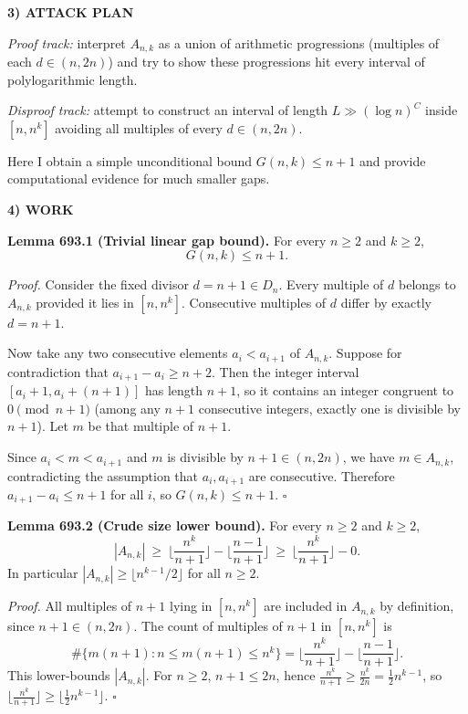 \bigskip
\noindent\textbf{3) ATTACK PLAN}

\emph{Proof track:} interpret $A_{n,k}$ as a union of arithmetic progressions (multiples of each $d\in(n,2n)$) and try to show these progressions hit every interval of polylogarithmic length.

\emph{Disproof track:} attempt to construct an interval of length $L\gg (\log n)^C$ inside $[n,n^k]$ avoiding all multiples of every $d\in(n,2n)$.

Here I obtain a simple unconditional bound $G(n,k)\le n+1$ and provide computational evidence for much smaller gaps.

\bigskip
\noindent\textbf{4) WORK}

\noindent\textbf{Lemma 693.1 (Trivial linear gap bound).}
For every $n\ge 2$ and $k\ge 2$,
\[
G(n,k)\le n+1.
\]

\smallskip
\noindent\emph{Proof.}
Consider the fixed divisor $d=n+1\in D_n$. Every multiple of $d$ belongs to $A_{n,k}$ provided it lies in $[n,n^k]$. Consecutive multiples of $d$ differ by exactly $d=n+1$.

Now take any two consecutive elements $a_i<a_{i+1}$ of $A_{n,k}$. Suppose for contradiction that $a_{i+1}-a_i\ge n+2$. Then the integer interval $[a_i+1,a_i+(n+1)]$ has length $n+1$, so it contains an integer congruent to $0\pmod{n+1}$ (among any $n+1$ consecutive integers, exactly one is divisible by $n+1$). Let $m$ be that multiple of $n+1$.

Since $a_i<m<a_{i+1}$ and $m$ is divisible by $n+1\in(n,2n)$, we have $m\in A_{n,k}$, contradicting the assumption that $a_i,a_{i+1}$ are consecutive. Therefore $a_{i+1}-a_i\le n+1$ for all $i$, so $G(n,k)\le n+1$. \hfill$\square$

\medskip
\noindent\textbf{Lemma 693.2 (Crude size lower bound).}
For every $n\ge 2$ and $k\ge 2$,
\[
|A_{n,k}|\ \ge\ \Big\lfloor\frac{n^k}{n+1}\Big\rfloor-\Big\lfloor\frac{n-1}{n+1}\Big\rfloor\ \ge\ \Big\lfloor\frac{n^k}{n+1}\Big\rfloor-0.
\]
In particular $|A_{n,k}|\ge \lfloor n^{k-1}/2\rfloor$ for all $n\ge 2$.

\smallskip
\noindent\emph{Proof.}
All multiples of $n+1$ lying in $[n,n^k]$ are included in $A_{n,k}$ by definition, since $n+1\in(n,2n)$. The count of multiples of $n+1$ in $[n,n^k]$ is
\[
\#\{m(n+1): n\le m(n+1)\le n^k\}=\Big\lfloor\frac{n^k}{n+1}\Big\rfloor-\Big\lfloor\frac{n-1}{n+1}\Big\rfloor.
\]
This lower-bounds $|A_{n,k}|$. For $n\ge 2$, $n+1\le 2n$, hence $\frac{n^k}{n+1}\ge \frac{n^k}{2n}=\frac{1}{2}n^{k-1}$, so $\lfloor\frac{n^k}{n+1}\rfloor\ge \lfloor\frac{1}{2}n^{k-1}\rfloor$. \hfill$\square$

